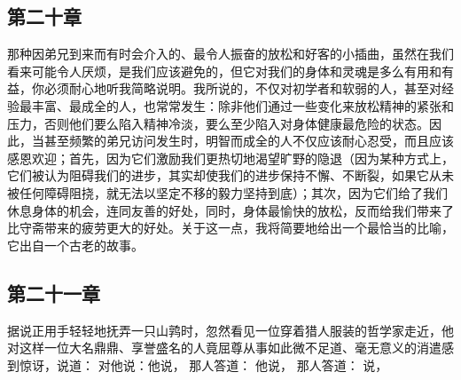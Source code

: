 \subsection{第二十章}

\par

那种因弟兄到来而有时会介入的、最令人振奋的放松和好客的小插曲，虽然在我们看来可能令人厌烦，是我们应该避免的，但它对我们的身体和灵魂是多么有用和有益，你必须耐心地听我简略说明。我所说的，不仅对初学者和软弱的人，甚至对经验最丰富、最成全的人，也常常发生：除非他们通过一些变化来放松精神的紧张和压力，否则他们要么陷入精神冷淡，要么至少陷入对身体健康最危险的状态。因此，当甚至频繁的弟兄访问发生时，明智而成全的人不仅应该耐心忍受，而且应该感恩欢迎；首先，因为它们激励我们更热切地渴望旷野的隐退（因为某种方式上，它们被认为阻碍我们的进步，其实却使我们的进步保持不懈、不断裂，如果它从未被任何障碍阻挠，就无法以坚定不移的毅力坚持到底）；其次，因为它们给了我们休息身体的机会，连同友善的好处，同时，身体最愉快的放松，反而给我们带来了比守斋带来的疲劳更大的好处。关于这一点，我将简要地给出一个最恰当的比喻，它出自一个古老的故事。\par


\subsection{第二十一章}

\par

据说正用手轻轻地抚弄一只山鹑时，忽然看见一位穿着猎人服装的哲学家走近，他对这样一位大名鼎鼎、享誉盛名的人竟屈尊从事如此微不足道、毫无意义的消遣感到惊讶，说道： 对他说：他说， 那人答道： 他说， 那人答道： 说，\par

